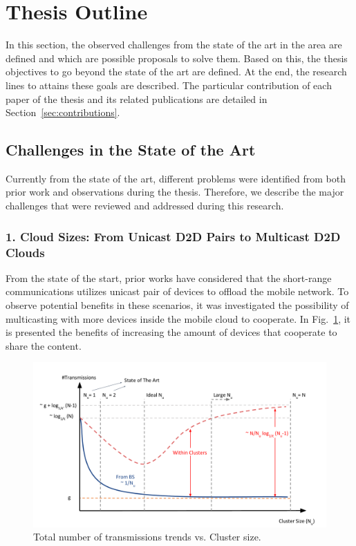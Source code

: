 \section{Thesis Outline}\label{sec:intro_thesis_outline}

In this section, the observed challenges from the state of the art in the area are defined and which are possible proposals to solve them. Based on this, the thesis objectives to go beyond the state of the art are defined. At the end, the research lines to attains these goals are described. The particular contribution of each paper of the thesis and its related publications are detailed in Section~\ref{sec:contributions}.

\subsection{Challenges in the State of the Art}
Currently from the state of the art, different problems were identified from both prior work and observations during the thesis. Therefore, we describe the major challenges that were reviewed and addressed during this research. 

\subsubsection{1. Cloud Sizes: From Unicast D2D Pairs to Multicast D2D Clouds}
\label{sec:cloud_sizes}

From the state of the start, prior works have considered that the short-range communications utilizes unicast pair of devices to offload the mobile network. To observe potential benefits in these scenarios, it was investigated the possibility of multicasting with more devices inside the mobile cloud to cooperate. In Fig.~\ref{fig:cloud_sizes}, it is presented the benefits of increasing the amount of devices that cooperate to share the content.

\begin{figure}[h]
  \centering
  \includegraphics[width=\textwidth]{introduction/figures/cloud_sizes.pdf}
  \caption{Total number of transmissions trends vs. Cluster size.}
\label{fig:cloud_sizes}
\end{figure}

